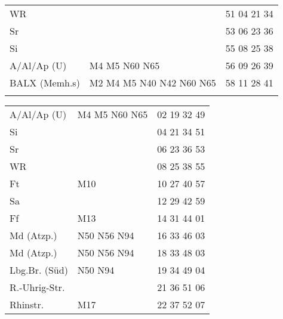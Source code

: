 \begin{tabular}{!{\color{schiefergrau}\vrule width 3pt}*{3}{l!{\color{schiefergrau}\vrule width 3pt}}}
WR           &                                                               & 51 04 21 34 \\
Sr           &                                                               & 53 06 23 36 \\
Si           &                                                               & 55 08 25 38 \\
A/Al/Ap (U)  & \mtram{} M4 M5 \nbus{} N60 N65                                & 56 09 26 39 \\
BALX (Memh.s)& \nuzwei{} \nuacht{} \mtram{} M2 M4 M5 \nbus{} N40 N42 N60 N65 & 58 11 28 41 \\
\myhline
\end{tabular}
%
\begin{tabular}{!{\color{schiefergrau}\vrule width 3pt}*{3}{l!{\color{schiefergrau}\vrule width 3pt}}}
\hline
{}
 \\
\hline
A/Al/Ap (U)  & \mtram{} M4 M5 \nbus{} N60 N65                            & 02 19 32 49 \\
Si           &                                                           & 04 21 34 51 \\
Sr           &                                                           & 06 23 36 53 \\
WR           &                                                           & 08 25 38 55 \\
Ft           & \mtram{} M10                                              & 10 27 40 57 \\
Sa           &                                                           & 12 29 42 59 \\
Ff           & \mtram{} M13                                              & 14 31 44 01 \\
Md (Atzp.)   & \nbus{} N50 N56 N94                                       & 16 33 46 03 \\
\hline
Md (Atzp.)   & \nbus{} N50 N56 N94                                       & 18 33 48 03 \\
Lbg.Br. (Süd)& \nbus{} N50 N94                                           & 19 34 49 04 \\
R.-Uhrig-Str.&                                                           & 21 36 51 06 \\
Rhinstr.     & \mtram{} M17                                              & 22 37 52 07 \\

\end{tabular}
